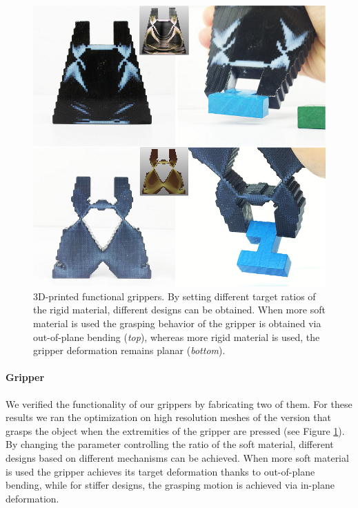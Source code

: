 		\begin{figure}[h]
			\centering
			\includegraphics[width=.6\linewidth]{images/gripper_print.png}
			\caption{3D-printed functional grippers. By setting different target ratios of the rigid material, different designs can be obtained. 
				When more soft material is used the grasping behavior of the gripper is obtained via out-of-plane bending (\emph{top}), whereas more rigid material is used, the gripper deformation remains planar (\emph{bottom}).} 
			\label{fig:gripper_printed}
		\end{figure}
		\paragraph{Gripper}
		We verified the functionality of our grippers by fabricating two of them. For these results we ran the optimization on high resolution meshes of the version that grasps the object when the extremities of the gripper are pressed (see Figure \ref{fig:gripper_printed}). By changing the parameter controlling the ratio of the soft material, different designs based on different mechanisms can be achieved. When more soft material is used the gripper achieves its target deformation thanks to out-of-plane bending, while for stiffer designs, the grasping motion is achieved via in-plane deformation.
